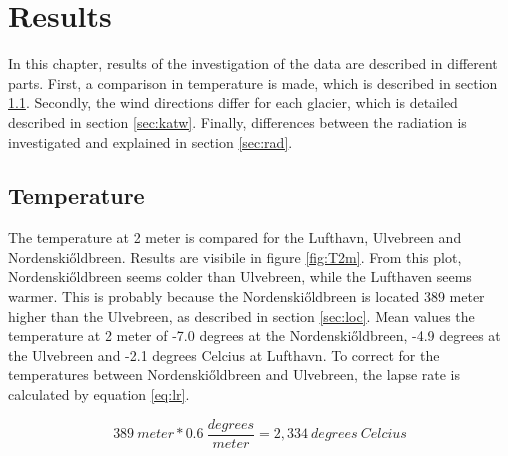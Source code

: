 \documentclass[11pt]{report}
\begin{document}







\newpage
\chapter{Results}\label{sec:results}
In this chapter, results of the investigation of the data are described in different parts. First, a comparison in temperature is made, which is described in section \ref{sec:T}. Secondly, the wind directions differ for each glacier, which is detailed described in section \ref{sec:katw}. Finally, differences between the radiation is investigated and explained in section \ref{sec:rad}.

\section{Temperature} \label{sec:T}
The temperature at 2 meter is compared for the Lufthavn, Ulvebreen and Nordenski\H{o}ldbreen. Results are visibile in figure \ref{fig:T2m}. From this plot, Nordenski\H{o}ldbreen seems colder than Ulvebreen, while the Lufthaven seems warmer. This is probably because the Nordenski\H{o}ldbreen is located 389 meter higher than the Ulvebreen, as described in section \ref{sec:loc}. Mean values the temperature at 2 meter of -7.0 degrees at the Nordenski\H{o}ldbreen, -4.9 degrees at the Ulvebreen and -2.1 degrees Celcius at Lufthavn. To correct for the temperatures between Nordenski\H{o}ldbreen and Ulvebreen, the lapse rate is calculated by equation \ref{eq:lr}.

\begin{equation}\label{eq:lr}
389 \ meter * 0.6 \ \frac{degrees}{meter} = 2,334 \ degrees \ Celcius
\end{equation}
\end{document}
